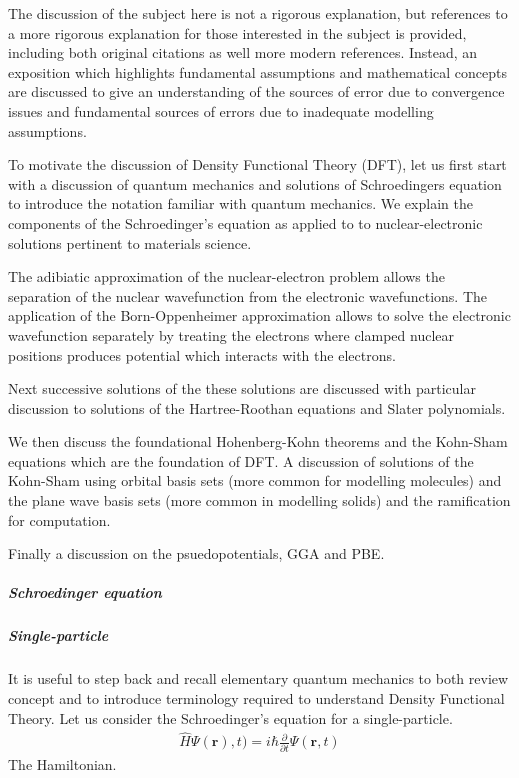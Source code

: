\documentclass[letterpaper,10pt,english]{sphinxmanual}
\begin{document}
The discussion of the subject here is not a rigorous explanation, but references to a more rigorous explanation for those interested in the subject is provided, including both original citations as well more modern references.  Instead, an exposition which highlights fundamental assumptions and mathematical concepts are discussed to give an understanding of the sources of error due to convergence issues and fundamental sources of errors due to inadequate modelling assumptions.

To motivate the discussion of Density Functional Theory (DFT), let us first start with a discussion of quantum mechanics and solutions of Schroedingers equation to introduce the notation familiar with quantum mechanics.  We explain the components of the Schroedinger’s equation as applied to to nuclear-electronic solutions pertinent to materials science.

The adibiatic approximation of the nuclear-electron problem allows the separation of the nuclear wavefunction from the electronic wavefunctions.  The application of the Born-Oppenheimer approximation allows to solve the electronic wavefunction separately by treating the electrons where clamped nuclear positions produces potential which interacts with the electrons.

Next successive solutions of the these solutions are discussed with particular discussion to solutions of the Hartree-Roothan equations and Slater polynomials.

We then discuss the foundational Hohenberg-Kohn theorems and the Kohn-Sham equations which are the foundation of DFT.  A discussion of solutions of the Kohn-Sham using orbital basis sets (more common for modelling molecules) and the plane wave basis sets (more common in modelling solids) and the ramification for computation.

Finally a discussion on the psuedopotentials, GGA and PBE.


\subparagraph{Schroedinger equation}
\label{\detokenize{dft/dft_intro:schroedinger-equation}}

\subparagraph{Single-particle}
\label{\detokenize{dft/dft_intro:single-particle}}
It is useful to step back and recall elementary quantum mechanics to both review concept and to introduce terminology required to understand Density Functional Theory.  Let us consider the Schroedinger’s equation for a single-particle.
\begin{equation*}
\begin{split}\hat{H}\Psi(\bm{r}),t) = i \hbar \frac{\partial}{\partial t} \Psi(\mathbf{r},t)\end{split}
\end{equation*}
The Hamiltonian.
\end{document}
